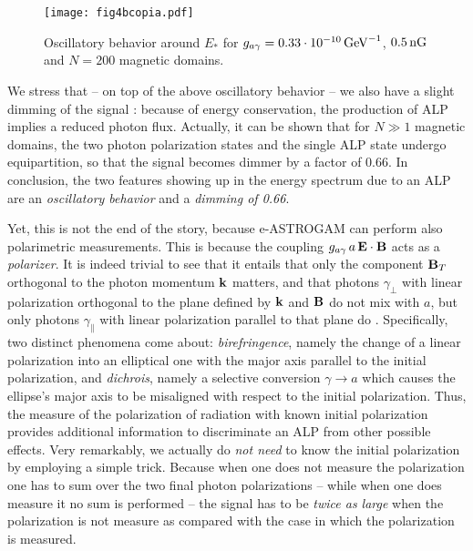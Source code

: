 \documentclass[aps,12pt,tightenlines,amsmath,amssymb]{revtex4}
\begin{document}
\begin{figure}[h]
\centering
\texttt{[image: fig4bcopia.pdf]}
\caption{\label{marco} Oscillatory behavior around $E_*$ for $g_{a \gamma} = 0.33 \cdot 10^{- 10} \, {\rm GeV}^{- 1}$, 
$0.5 \, {\rm nG}$ and $N = 200$ magnetic domains.}
\end{figure}

We stress that -- on top of the above oscillatory behavior -- we also have a slight dimming of the signal \cite{dmr2008}: because of energy conservation, the production of ALP implies a reduced photon flux. Actually, it can be shown that for $N \gg 1$ magnetic domains, the two photon polarization states and the single ALP state undergo equipartition, so that the signal becomes dimmer by a factor of 0.66. In conclusion, the two features showing up in the energy spectrum due to an ALP are an {\it oscillatory behavior} and a {\it dimming of 0.66}. 

Yet, this is not the end of the story, because e-ASTROGAM can perform also polarimetric measurements. This is because the coupling $g_{a \gamma} \, a \, {\bf E} \cdot {\bf B}$ acts as a {\it polarizer}. It is indeed trivial to see that it entails that only the component ${\bf B}_T$ orthogonal to the photon momentum ${\bf k}$ matters, and that photons $\gamma_{\perp}$ with linear polarization orthogonal to the plane defined by ${\bf k}$ and ${\bf B}$ do not mix with $a$, but only photons $\gamma_{\parallel}$ with linear polarization parallel to that plane do \cite{mpz1986}. Specifically, two distinct phenomena come about: {\it birefringence}, namely the change of a linear polarization into an elliptical one with the major axis parallel to the initial polarization, and {\it dichrois}, namely a selective conversion $\gamma \to a$ which causes the ellipse's major axis to be misaligned with respect to the initial polarization. Thus, the measure of the polarization of radiation with known initial polarization provides additional information to discriminate an ALP from other possible effects. Very remarkably, we actually do {\it not need} to know the initial polarization by employing a simple trick. Because when one does not measure the polarization one has to sum over the two final photon polarizations -- while when one does measure it no sum is performed -- the signal has to be {\it twice as large} when the polarization is not measure as compared with the case in which the polarization is measured.
 
\end{document}
